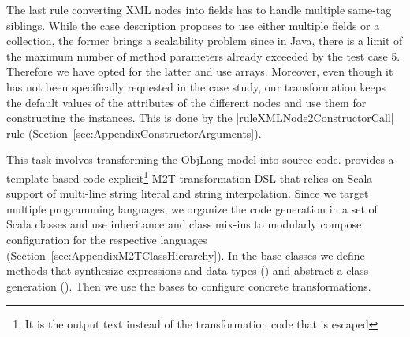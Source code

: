 The last rule converting XML nodes into fields has to handle multiple same-tag siblings.
While the case description proposes to use either multiple fields or a collection, the former brings a scalability problem since in Java, there is a limit of the maximum number of method parameters already exceeded by the test case 5.
Therefore we have opted for the latter and use arrays.
Moreover, even though it has not been specifically requested in the case study, our transformation keeps the default values of the attributes of the different nodes and use them for constructing the instances.
This is done by the \Scala|ruleXMLNode2ConstructorCall| rule (\Cf Section~\ref{sec:AppendixConstructorArguments}).


\enlargethispage{20mm}

This task involves transforming the ObjLang model into source code.
\SIGMA provides a template-based code-explicit\footnote{It is the output text instead of the transformation code that is escaped} M2T transformation DSL that relies on Scala support of multi-line string literal and string interpolation.
%
Since we target multiple programming languages, we organize the code generation in a set of Scala classes and use inheritance and class mix-ins to modularly compose configuration for the respective languages (\Cf Section~\ref{sec:AppendixM2TClassHierarchy}).
In the base classes we define methods that synthesize expressions and data types (\href{https://github.com/fikovnik/ttc14-fixml-sigma/blob/master/ttc14-fixml-base/src/fr/inria/spirals/sigma/ttc14/fixml/BaseObjLangMTT.scala}{}) and abstract a class generation (\href{https://github.com/fikovnik/ttc14-fixml-sigma/blob/master/ttc14-fixml-base/src/fr/inria/spirals/sigma/ttc14/fixml/BaseObjLang2Class.scala}{}).
Then we use the bases to configure concrete transformations.

